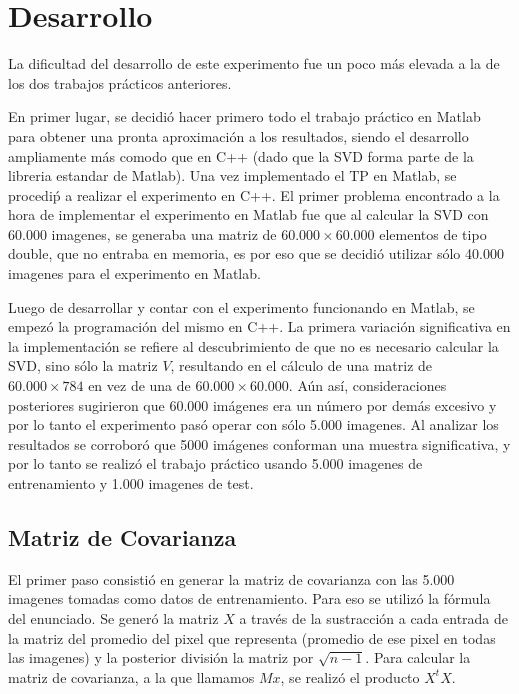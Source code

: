 \section{Desarrollo}
La dificultad del desarrollo de este experimento fue un poco m\'as elevada a la de los dos trabajos pr\'acticos anteriores. 

En primer lugar, se decidi\'o hacer primero todo el trabajo pr\'actico en Matlab para obtener una pronta aproximaci\'on a los resultados, siendo el desarrollo ampliamente m\'as comodo que en C++ (dado que la SVD forma parte de la libreria estandar de Matlab). Una vez implementado el TP en Matlab, se procedi\'p a realizar el experimento en C++. El primer problema encontrado a la hora de implementar el experimento en Matlab fue que al calcular la SVD con 60.000 imagenes, se generaba una matriz de $60.000 \times 60.000$ elementos de tipo double, que no entraba en memoria, es por eso que se decidi\'o utilizar s\'olo 40.000 imagenes para el experimento en Matlab.

Luego de desarrollar y contar con el experimento funcionando en Matlab, se empez\'o la programaci\'on del mismo en C++. La primera variaci\'on significativa en la implementaci\'on se refiere al descubrimiento de que no es necesario calcular la SVD, sino s\'olo la matriz $V$, resultando en el c\'alculo de una matriz de $60.000 \times 784$ en vez de una de $60.000 \times 60.000$. A\'un as\'i, consideraciones posteriores sugirieron que 60.000 im\'agenes era un n\'umero por dem\'as excesivo y por lo tanto el experimento pas\'o operar con s\'olo 5.000 imagenes. Al analizar los resultados se corrobor\'o que 5000 im\'agenes conforman una muestra significativa, y por lo tanto se realiz\'o el trabajo pr\'actico usando 5.000 imagenes de entrenamiento y 1.000 imagenes de test.

\subsection{Matriz de Covarianza}
El primer paso consisti\'o en generar la matriz de covarianza con las 5.000 imagenes tomadas como datos de entrenamiento. Para eso se utiliz\'o la f\'ormula del enunciado. Se gener\'o la matriz $X$ a trav\'es de la sustracci\'on a cada entrada de la matriz del promedio del pixel que representa (promedio de ese pixel en todas las imagenes) y la posterior divisi\'on la matriz por $\sqrt{n-1}$. Para calcular la matriz de covarianza, a la que llamamos $Mx$, se realiz\'o el producto $X^tX$.

